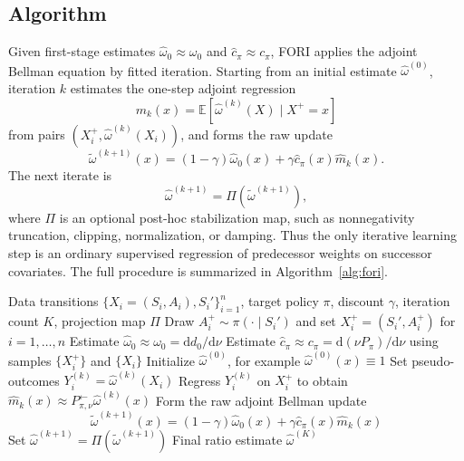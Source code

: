 \documentclass{article}
\newcommand{\mhat}{\widehat m}
\newcommand{\E}{\mathbb{E}}
\newcommand{\1}{\mathbf{1}}
\newcommand{\dd}{\mathrm{d}}
\newcommand{\cpi}{c_\pi}
\newcommand{\omegazero}{\omega_0}
\newcommand{\omegahatzero}{\widehat{\omega}_0}
\newcommand{\Pback}{P_{\pi,\nu}^{\leftarrow}}
\newcommand{\Mpi}{\Pback}
\newcommand{\Ppi}{P_\pi}
\newcommand{\dinit}{d_0}
\newcommand{\omegahat}{\widehat{\omega}}
\newcommand{\omegatilde}{\widetilde{\omega}}
\newcommand{\chat}{\widehat{c}_\pi}
\newcommand{\Proj}{\Pi}
\theoremstyle{plain}
\theoremstyle{definition}
\theoremstyle{remark}
\begin{document}
\subsection{Algorithm}

Given first-stage estimates $\omegahatzero\approx\omegazero$ and
$\chat\approx\cpi$, \textsc{FORI} applies the adjoint Bellman equation by fitted
iteration. Starting from an initial estimate
$\omegahat^{(0)}$, iteration $k$ estimates the one-step adjoint regression
\[
    m_k(x)=\E[\omegahat^{(k)}(X)\mid X^+=x]
\]
from pairs $(X_i^+,\omegahat^{(k)}(X_i))$, and forms the raw update
\[
    \omegatilde^{(k+1)}(x)
    =
    (1-\gamma)\omegahatzero(x)
    +
    \gamma\chat(x)\mhat_k(x).
\]
The next iterate is
\[
    \omegahat^{(k+1)}=\Proj(\omegatilde^{(k+1)}),
\]
where $\Proj$ is an optional post-hoc stabilization map, such as nonnegativity
truncation, clipping, normalization, or damping. Thus the only iterative
learning step is an ordinary supervised regression of predecessor weights on
successor covariates. The full procedure is summarized in
Algorithm~\ref{alg:fori}.




\begin{algorithm}[!htbp]
\caption{\textsc{FORI}: Fitted Occupancy-Ratio Iteration}
\label{alg:fori}
\begin{algorithmic}[1]
\Require Data transitions $\{X_i=(S_i,A_i),S_i'\}_{i=1}^n$, target policy $\pi$, discount $\gamma$, iteration count $K$, projection map $\Proj$
\State Draw $A_i^+\sim \pi(\cdot\mid S_i')$ and set $X_i^+=(S_i',A_i^+)$ for $i=1,\ldots,n$
\State Estimate $\omegahatzero\approx \omegazero=\dd\dinit/\dd\nu$
\State Estimate $\chat\approx \cpi=\dd(\nu\Ppi)/\dd\nu$ using samples $\{X_i^+\}$ and $\{X_i\}$
\State Initialize $\omegahat^{(0)}$, for example $\omegahat^{(0)}(x)\equiv 1$
    \State Set pseudo-outcomes $Y_i^{(k)}=\omegahat^{(k)}(X_i)$
    \State Regress $Y_i^{(k)}$ on $X_i^+$ to obtain $\mhat_k(x)\approx \Mpi\omegahat^{(k)}(x)$
    \State Form the raw adjoint Bellman update
    \[
        \omegatilde^{(k+1)}(x)
        =
        (1-\gamma)\omegahatzero(x)+\gamma \chat(x)\mhat_k(x)
    \]
    \State Set $\omegahat^{(k+1)}=\Proj(\omegatilde^{(k+1)})$
\EndFor
\Ensure Final ratio estimate $\omegahat^{(K)}$
\end{algorithmic}
\end{algorithm}
\end{document}
